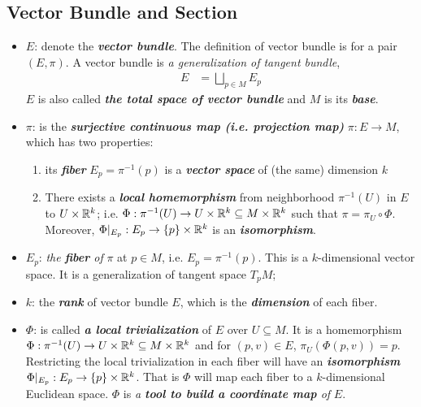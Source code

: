 \documentclass[11pt]{article}
\begin{document}
\subsection{Vector Bundle and Section}
\begin{itemize}
\item $E$: \quad denote the \textbf{\emph{vector bundle}}.  The definition of vector bundle is for a pair $(E, \pi)$. A vector bundle is \emph{a generalization of tangent bundle}, 
\begin{align*}
E &= \bigsqcup_{p\in M}E_p
\end{align*} $E$ is also called \emph{\textbf{the total space of vector bundle}} and $M$ is its \emph{\textbf{base}}.

\item $\pi$: \quad is the \emph{\textbf{surjective continuous map (i.e. projection map)}} $\pi: E \rightarrow M$, which has two properties: 
\begin{enumerate}
\item its \emph{\textbf{fiber}} $E_p = \pi^{-1}(p)$ is a \emph{\textbf{vector space}} of (the same) dimension $k$
\item There exists a \emph{\textbf{local homemorphism}} from neighborhood $\pi^{-1}(U)$ in $E$  to $U \times {\mathbb R}^{k}$; i.e. $\Phi: \pi^{-1}(U) \rightarrow U \times {\mathbb R}^{k} \subseteq M \times {\mathbb R}^{k}$ such that $\pi = \pi_U \circ \Phi$. Moreover, $\Phi|_{E_p}: E_p \rightarrow \left\{p\right\}\times {\mathbb R}^{k}$ is an \emph{\textbf{isomorphism}}. 
\end{enumerate}

\item  $E_p$: \quad \emph{the \textbf{fiber} of} $\pi$ at $p\in M$, i.e. $E_p = \pi^{-1}(p)$. This is a $k$-dimensional vector space. It is a generalization of tangent space $T_pM$;

\item $k$: \quad the \emph{\textbf{rank}} of vector bundle $E$, which is the \emph{\textbf{dimension}} of each fiber.

\item $\Phi$: \quad  is called \emph{\textbf{a local trivialization}} of $E$ over $U \subseteq M$. It is a homemorphism $\Phi: \pi^{-1}(U) \rightarrow U \times {\mathbb R}^{k} \subseteq M \times {\mathbb R}^{k}$ and for $(p, v) \in E$, $\pi_{U}(\Phi(p, v)) = p$. Restricting the local trivialization in each fiber will have an \emph{\textbf{isomorphism}} $\Phi|_{E_p}: E_p \rightarrow \left\{p\right\}\times {\mathbb R}^{k}$. That is $\Phi$ will map each fiber to a $k$-dimensional Euclidean space. $\Phi$ is \emph{a \textbf{tool to build a coordinate map} of} $E$.


\end{itemize}
\end{document}
